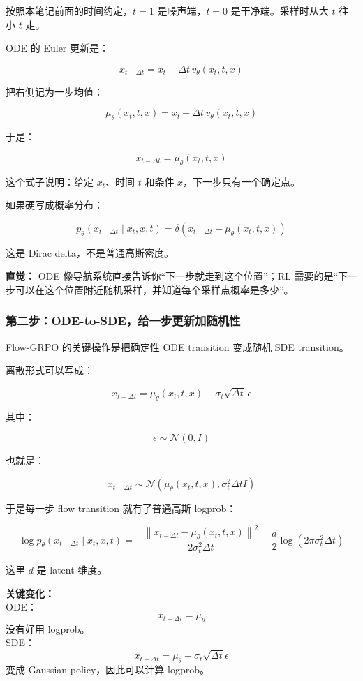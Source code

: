 按照本笔记前面的时间约定，$t=1$ 是噪声端，$t=0$ 是干净端。采样时从大 $t$ 往小 $t$ 走。

ODE 的 Euler 更新是：

\[
x_{t-\Delta t}
=
x_t
-
\Delta t\,v_\theta(x_t,t,x)
\]

把右侧记为一步均值：

\[
\mu_\theta(x_t,t,x)
=
x_t
-
\Delta t\,v_\theta(x_t,t,x)
\]

于是：

\[
x_{t-\Delta t}
=
\mu_\theta(x_t,t,x)
\]

这个式子说明：给定 $x_t$、时间 $t$ 和条件 $x$，下一步只有一个确定点。

如果硬写成概率分布：

\[
p_\theta(x_{t-\Delta t}\mid x_t,x,t)
=
\delta
\left(
x_{t-\Delta t}
-
\mu_\theta(x_t,t,x)
\right)
\]

这是 Dirac delta，不是普通高斯密度。

\begin{intubox}
\textbf{直觉：} ODE 像导航系统直接告诉你“下一步就走到这个位置”；RL 需要的是“下一步可以在这个位置附近随机采样，并知道每个采样点概率是多少”。
\end{intubox}

\subsubsection{第二步：ODE-to-SDE，给一步更新加随机性}

Flow-GRPO 的关键操作是把确定性 ODE transition 变成随机 SDE transition。

离散形式可以写成：

\[
x_{t-\Delta t}
=
\mu_\theta(x_t,t,x)
+
\sigma_t\sqrt{\Delta t}\,\epsilon
\]

其中：

\[
\epsilon\sim\mathcal{N}(0,I)
\]

也就是：

\[
x_{t-\Delta t}
\sim
\mathcal{N}
\left(
\mu_\theta(x_t,t,x),
\sigma_t^2\Delta t I
\right)
\]

于是每一步 flow transition 就有了普通高斯 logprob：

\[
\log p_\theta(x_{t-\Delta t}\mid x_t,x,t)
=
-
\frac{
\left\|
x_{t-\Delta t}
-
\mu_\theta(x_t,t,x)
\right\|^2
}{
2\sigma_t^2\Delta t
}
-
\frac{d}{2}
\log(2\pi\sigma_t^2\Delta t)
\]

这里 $d$ 是 latent 维度。

\begin{summarybox}
\textbf{关键变化：}\\
ODE：
\[
x_{t-\Delta t}=\mu_\theta
\]
没有好用 logprob。\\
SDE：
\[
x_{t-\Delta t}=\mu_\theta+\sigma_t\sqrt{\Delta t}\epsilon
\]
变成 Gaussian policy，因此可以计算 logprob。
\end{summarybox}

